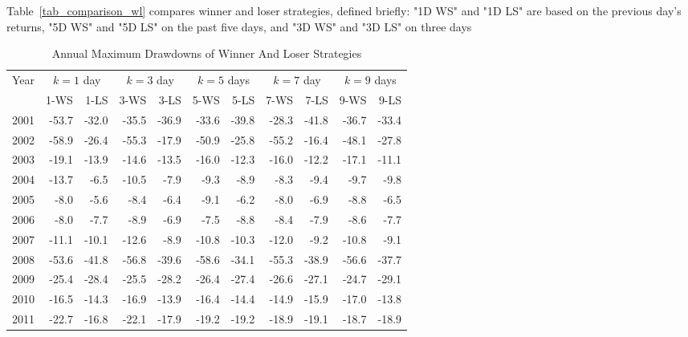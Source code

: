 \documentclass{article}
\begin{document}
Table~\ref{tab_comparison_wl} compares winner and loser strategies, defined briefly: "1D WS" and "1D LS" are based on the previous day's returns, "5D WS" and "5D LS" on the past five days, and "3D WS" and "3D LS" on three days

\begin{table}[!ht]
    \centering
    \caption{Annual Maximum Drawdowns of Winner And Loser Strategies}
    \medskip
    \begin{tabular}{l | rr | rr | rr | rr| rr}
    \hline
\multirow{2}{*}{Year} & \multicolumn{2}{c|}{$k=1$ day}   
& \multicolumn{2}{c|}{$k=3$ day}  & \multicolumn{2}{c|}{$k=5$ days}   
& \multicolumn{2}{c|}{$k=7$ day}   & \multicolumn{2}{c}{$k=9$ days}\\
 & 1-WS & 1-LS & 3-WS & 3-LS & 5-WS & 5-LS & 7-WS & 7-LS & 9-WS & 9-LS \\
 \hline
2001 & \cellcolor{red!25}-53.7 & -32.0 & -35.5 & -36.9 & -33.6 & -39.8 & \cellcolor{green!25}-28.3 & -41.8 & -36.7 & -33.4 \\
2002 & \cellcolor{red!25}-58.9 & -26.4 & -55.3 & -17.9 & -50.9 & -25.8 & -55.2 & \cellcolor{green!25}-16.4 & -48.1 & -27.8 \\
2003 & \cellcolor{red!25}-19.1 & -13.9 & -14.6 & -13.5 & -16.0 & -12.3 & -16.0 & -12.2 & -17.1 & \cellcolor{green!25}-11.1 \\
2004 & \cellcolor{red!25}-13.7 & \cellcolor{green!25}-6.5 & -10.5 & -7.9 & -9.3 & -8.9 & -8.3 & -9.4 & -9.7 & -9.8 \\
2005 & -8.0 & \cellcolor{green!25}-5.6 & -8.4 & -6.4 & \cellcolor{red!25}-9.1 & -6.2 & -8.0 & -6.9 & -8.8 & -6.5 \\
2006 & -8.0 & -7.7 & \cellcolor{red!25}-8.9 & \cellcolor{green!25}-6.9 & -7.5 & -8.8 & -8.4 & -7.9 & -8.6 & -7.7 \\
2007 & -11.1 & -10.1 & \cellcolor{red!25}-12.6 & \cellcolor{green!25}-8.9 & -10.8 & -10.3 & -12.0 & -9.2 & -10.8 & -9.1 \\
2008 & -53.6 & -41.8 & -56.8 & -39.6 & \cellcolor{red!25}-58.6 & \cellcolor{green!25}-34.1 & -55.3 & -38.9 & -56.6 & -37.7 \\
2009 & -25.4 & -28.4 & -25.5 & -28.2 & -26.4 & -27.4 & -26.6 & -27.1 & \cellcolor{green!25}-24.7 & \cellcolor{red!25}-29.1 \\
2010 & -16.5 & -14.3 & -16.9 & -13.9 & -16.4 & -14.4 & -14.9 & -15.9 & \cellcolor{red!25}-17.0 & \cellcolor{green!25}-13.8 \\
2011 & \cellcolor{red!25}-22.7 & \cellcolor{green!25}-16.8 & -22.1 & -17.9 & -19.2 & -19.2 & -18.9 & -19.1 & -18.7 & -18.9 \\

\end{tabular}
\end{table}
\end{document}
